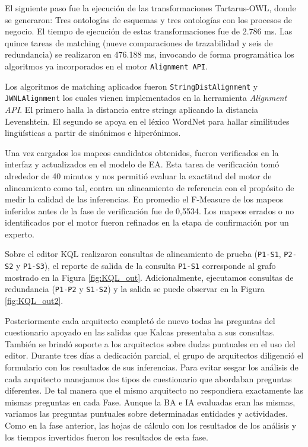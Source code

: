 El siguiente paso fue la ejecuci\'on de las transformaciones Tartarus-OWL, donde se generaron: Tres ontolog\'ias de esquemas y tres ontolog\'ias con los procesos de negocio. El tiempo de ejecuci\'on de estas transformaciones fue de 2.786 ms. Las quince tareas de matching (nueve comparaciones de trazabilidad y seis de redundancia) se realizaron en 476.188 ms, invocando de forma program\'atica los algoritmos ya incorporados en el motor \texttt{Alignment API}.

Los algoritmos de matching aplicados fueron \texttt{StringDistAlignment} y \texttt{JWNLAlignment} los cuales vienen implementados en la herramienta \textit{Alignment API}. El primero halla la distancia entre strings aplicando la distancia Levenshtein. El segundo se apoya en el l\'exico WordNet \cite{Miller:1995} para hallar similitudes ling\"u\'isticas a partir de sin\'onimos e hiper\'onimos. 

Una vez cargados los mapeos candidatos obtenidos, fueron verificados en la interfaz y actualizados en el modelo de EA. Esta tarea de verificaci\'on tom\'o alrededor de 40 minutos y nos permiti\'o evaluar la exactitud del motor de alineamiento como tal, contra un alineamiento de referencia con el prop\'osito de medir la calidad de las inferencias. En promedio el F-Measure de los mapeos inferidos antes de la fase de verificaci\'on fue de 0,5534. Los mapeos errados o no identificados por el motor fueron refinados en la etapa de confirmaci\'on por un experto.

Sobre el editor KQL realizaron consultas de alineamiento de prueba (\texttt{P1-S1}, \texttt{P2-S2} y \texttt{P1-S3}), el reporte de salida de la consulta \texttt{P1-S1} corresponde al grafo mostrado en la Figura \ref{fig:KQL_out}. Adicionalmente, ejecutamos consultas de redundancia (\texttt{P1-P2} y \texttt{S1-S2}) y la salida se puede observar en la Figura \ref{fig:KQL_out2}.

Posteriormente cada arquitecto complet\'o de nuevo todas las preguntas del cuestionario apoyado en las salidas que Kalcas presentaba a sus consultas. Tambi\'en se brind\'o soporte a los arquitectos sobre dudas puntuales en el uso del editor. Durante tres d\'ias a dedicaci\'on parcial, el grupo de arquitectos diligenci\'o el formulario con los resultados de sus inferencias. Para evitar sesgar los an\'alisis de cada arquitecto manejamos dos tipos de cuestionario que abordaban preguntas diferentes. De tal manera que el mismo arquitecto no respondiera exactamente las mismas preguntas en cada Fase. Aunque la BA e IA evaluadas eran las mismas, variamos las preguntas puntuales sobre determinadas entidades y actividades. Como en la fase anterior, las hojas de c\'alculo con los resultados de los an\'alisis y los tiempos invertidos fueron los resultados de esta fase.

